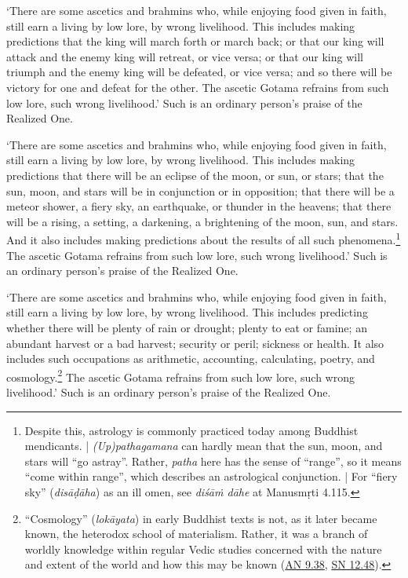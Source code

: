 \documentclass[12pt,openany]{book}%
\begin{document}
‘There are some ascetics and brahmins who, while enjoying food given in faith, still earn a living by low lore, by wrong livelihood. This includes making predictions that the king will march forth or march back; or that our king will attack and the enemy king will retreat, or vice versa; or that our king will triumph and the enemy king will be defeated, or vice versa; and so there will be victory for one and defeat for the other. The ascetic Gotama refrains from such low lore, such wrong livelihood.’ Such is an ordinary person’s praise of the Realized One. 

‘There are some ascetics and brahmins who, while enjoying food given in faith, still earn a living by low lore, by wrong livelihood. This includes making predictions that there will be an eclipse of the moon, or sun, or stars; that the sun, moon, and stars will be in conjunction or in opposition; that there will be a meteor shower, a fiery sky, an earthquake, or thunder in the heavens; that there will be a rising, a setting, a darkening, a brightening of the moon, sun, and stars. And it also includes making predictions about the results of all such phenomena.\footnote{Despite this, astrology is commonly practiced today among Buddhist mendicants. | \textit{(Up)pathagamana} can hardly mean that the sun, moon, and stars will “go astray”. Rather, \textit{patha} here has the sense of “range”, so it means “come within range”, which describes an astrological conjunction. | For “fiery sky” (\textit{\textsanskrit{disāḍāha}}) as an ill omen, see \textit{\textsanskrit{diśāṁ} \textsanskrit{dāhe}} at \textsanskrit{Manusmṛti} 4.115. } The ascetic Gotama refrains from such low lore, such wrong livelihood.’ Such is an ordinary person’s praise of the Realized One. 

‘There are some ascetics and brahmins who, while enjoying food given in faith, still earn a living by low lore, by wrong livelihood. This includes predicting whether there will be plenty of rain or drought; plenty to eat or famine; an abundant harvest or a bad harvest; security or peril; sickness or health. It also includes such occupations as arithmetic, accounting, calculating, poetry, and cosmology.\footnote{“Cosmology” (\textit{\textsanskrit{lokāyata}}) in early Buddhist texts is not, as it later became known, the heterodox school of materialism. Rather, it was a branch of worldly knowledge within regular Vedic studies concerned with the nature and extent of the world and how this may be known (\href{https://suttacentral.net/an9.38/en/sujato}{AN 9.38}, \href{https://suttacentral.net/sn12.48/en/sujato}{SN 12.48}). } The ascetic Gotama refrains from such low lore, such wrong livelihood.’ Such is an ordinary person’s praise of the Realized One. 
\end{document}
